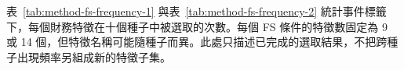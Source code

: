 

表~\ref{tab:method-fs-frequency-1} 與表~\ref{tab:method-fs-frequency-2} 統計事件標籤下，每個財務特徵在十個種子中被選取的次數。每個 FS 條件的特徵數固定為 9 或 14 個，但特徵名稱可能隨種子而異。此處只描述已完成的選取結果，不把跨種子出現頻率另組成新的特徵子集。



\endgroup
